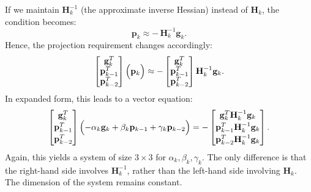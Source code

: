 \documentclass[12pt]{article}
\begin{document}
If we maintain \(\mathbf{H}_k^{-1}\) (the approximate inverse Hessian) instead of \(\mathbf{H}_k\), the condition becomes:
\[
\mathbf{p}_k \approx -\,\mathbf{H}_k^{-1} \mathbf{g}_k.
\]
Hence, the projection requirement changes accordingly:
\[
\begin{bmatrix}
\mathbf{g}_k^T \\
\mathbf{p}_{k-1}^T \\
\mathbf{p}_{k-2}^T
\end{bmatrix}
\Bigl(\mathbf{p}_k\Bigr)
\approx
-\begin{bmatrix}
\mathbf{g}_k^T \\
\mathbf{p}_{k-1}^T \\
\mathbf{p}_{k-2}^T
\end{bmatrix}
\mathbf{H}_k^{-1} \mathbf{g}_k.
\]
In expanded form, this leads to a vector equation:
\[
\begin{bmatrix}
\mathbf{g}_k^T \\[2pt]
\mathbf{p}_{k-1}^T \\[2pt]
\mathbf{p}_{k-2}^T
\end{bmatrix}
\Bigl(-\alpha_k \mathbf{g}_k + \beta_k \mathbf{p}_{k-1} + \gamma_k \mathbf{p}_{k-2}\Bigr)
=
-\begin{bmatrix}
\mathbf{g}_k^T \mathbf{H}_k^{-1} \mathbf{g}_k \\[2pt]
\mathbf{p}_{k-1}^T \mathbf{H}_k^{-1} \mathbf{g}_k \\[2pt]
\mathbf{p}_{k-2}^T \mathbf{H}_k^{-1} \mathbf{g}_k
\end{bmatrix}.
\]
Again, this yields a system of size \(3 \times 3\) for \(\alpha_k, \beta_k, \gamma_k\). The only difference is that the right-hand side involves \(\mathbf{H}_k^{-1}\), rather than the left-hand side involving  \(\mathbf{H}_k\). The dimension of the system remains constant.
\end{document}
